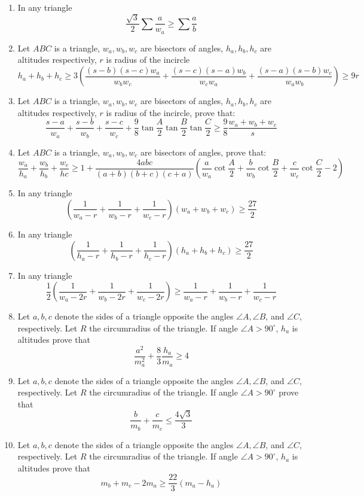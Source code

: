 \documentclass{report}
\begin{document}
\begin{enumerate}
	\item In any triangle $$ \frac {\sqrt {3}}{2}\sum\frac {a}{w_a}\geq \sum\frac {a}{b}$$
	\item Let $ ABC$ is a triangle, $ w_a, w_b, w_c$ are bisectors of angles, $ h_a, h_b, h_c$ are altitudes respectively, $ r$ is radius of the incircle$$ h_a + h_b + h_c \geq 3(\frac {(s - b)(s - c)w_a}{w_bw_c} + \frac {(s - c)(s - a)w_b}{w_cw_a} + \frac {(s - a)(s - b)w_c}{w_aw_b}) \geq 9r$$
	\item Let $ ABC$ is a triangle, $ w_a, w_b, w_c$ are bisectors of angles, $ h_a, h_b, h_c$ are altitudes respectively, $ r$ is radius of the incircle, prove that:$$ \frac{s-a}{w_a}+\frac{s-b}{w_b}+\frac{s-c}{w_c}+\frac{9}{8}\tan\frac{A}{2}\tan\frac{B}{2}\tan\frac{C}{2} \geq \frac{9}{8}\frac{w_a+w_b+w_c}{s}$$
	\item Let $ ABC$ is a triangle, $ w_a, w_b, w_c$ are bisectors of angles, prove that:$$ \frac {w_a}{h_a} + \frac {w_b}{h_b} + \frac {w_c}{hc} \geq 1 + \frac {4abc}{(a + b)(b + c)(c + a)}(\frac {a}{w_a}\cot\frac {A}{2} + \frac {b}{w_b}\cot\frac {B}{2} + \frac {c}{w_c}\cot\frac {C}{2} - 2)$$
	\item In any triangle$$ \left( \frac{1}{w_a-r}+\frac{1}{w_b-r}+\frac{1}{w_c-r}\right)\left( w_a+w_b+w_c\right)  \geq \frac{27}{2}$$
	\item In any triangle$$ \left( \frac{1}{h_a-r}+\frac{1}{h_b-r}+\frac{1}{h_c-r}\right) \left( h_a+h_b+h_c\right)  \geq \frac{27}{2}$$
	\item In any triangle $$ \frac{1}{2}\left( \frac {1}{w_a - 2r} + \frac {1}{w_b - 2r} + \frac {1}{w_c - 2r}\right)\geq  \frac {1}{w_a - r} + \frac{1}{w_b - r} + \frac {1}{w_c - r}$$
	\item Let $ a,b,c$ denote the sides of a triangle opposite the angles $ \angle A,\angle B$, and $\angle  C$, respectively. Let $R$ the circumradius of the triangle. If angle $\angle A > 90^{\circ}$, $h_a$ is altitudes prove that $$\frac {a^2}{m_a^2} + \frac {8}{3}\frac {h_a}{m_a} \geq 4$$
	\item Let $ a,b,c$ denote the sides of a triangle opposite the angles $ \angle A,\angle B$, and $\angle  C$, respectively. Let $R$ the circumradius of the triangle. If angle $\angle A > 90^{\circ}$ prove that$$\frac {b}{m_b} + \frac {c}{m_c} \le \frac {4\sqrt {3}}{3}$$
	\item Let $ a,b,c$ denote the sides of a triangle opposite the angles $ \angle A,\angle B$, and $\angle  C$, respectively. Let $R$ the circumradius of the triangle. If angle $\angle A > 90^{\circ}$, $h_a$ is altitudes prove that$$m_b+m_c-2m_a \geq \frac{22}{3}(m_a-h_a)$$

\end{enumerate}
\end{document}
